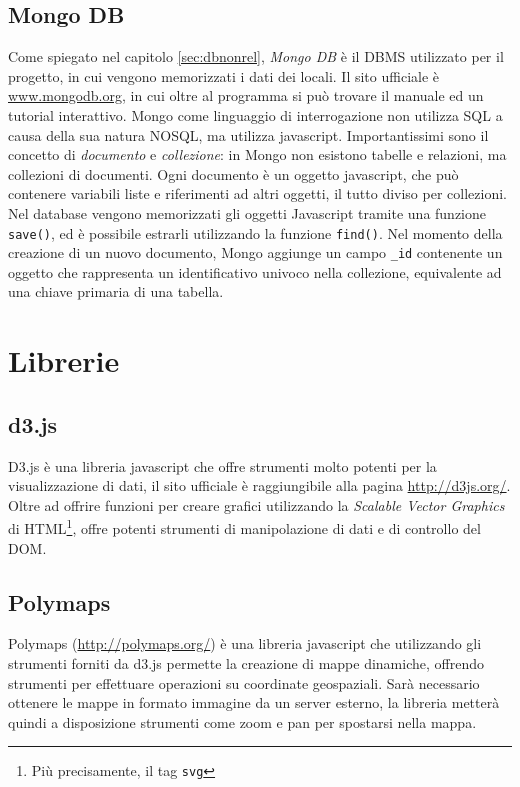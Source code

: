 \subsection{Mongo DB}\label{sec:mongo}
Come spiegato nel capitolo \ref{sec:dbnonrel}, \emph{Mongo DB} è il DBMS utilizzato per il progetto, in cui vengono memorizzati i dati dei locali. Il sito ufficiale è \url{www.mongodb.org}, in cui oltre al programma si può trovare il manuale ed un tutorial interattivo. Mongo come linguaggio di interrogazione non utilizza SQL a causa della sua natura NOSQL, ma utilizza javascript. Importantissimi sono il concetto di \emph{documento} e \emph{collezione}: in Mongo non esistono tabelle e relazioni, ma collezioni di documenti. Ogni documento è un oggetto javascript, che può contenere variabili liste e riferimenti ad altri oggetti, il tutto diviso per collezioni. Nel database vengono memorizzati gli oggetti Javascript tramite una funzione \texttt{save()}, ed è possibile estrarli utilizzando la funzione \texttt{find()}. Nel momento della creazione di un nuovo documento, Mongo aggiunge un campo \texttt{\_id} contenente un oggetto che rappresenta un identificativo univoco nella collezione, equivalente ad una chiave primaria di una tabella.

\section{Librerie}
\subsection{d3.js}\label{sec:d3}
D3.js è una libreria javascript che offre strumenti molto potenti per la visualizzazione di dati, il sito ufficiale è raggiungibile alla pagina \url{http://d3js.org/}. Oltre ad offrire funzioni per creare grafici utilizzando la \emph{Scalable Vector Graphics} di HTML\footnote{Più precisamente, il tag \texttt{svg}}, offre potenti strumenti di manipolazione di dati e di controllo del DOM.
		
\subsection{Polymaps}\label{sec:polymaps}
Polymaps (\url{http://polymaps.org/}) è una libreria javascript che utilizzando gli strumenti forniti da d3.js permette la creazione di mappe dinamiche, offrendo strumenti per effettuare operazioni su coordinate geospaziali. Sarà necessario ottenere le mappe in formato immagine da un server esterno, la libreria metterà quindi a disposizione strumenti come zoom e pan per spostarsi nella mappa.






